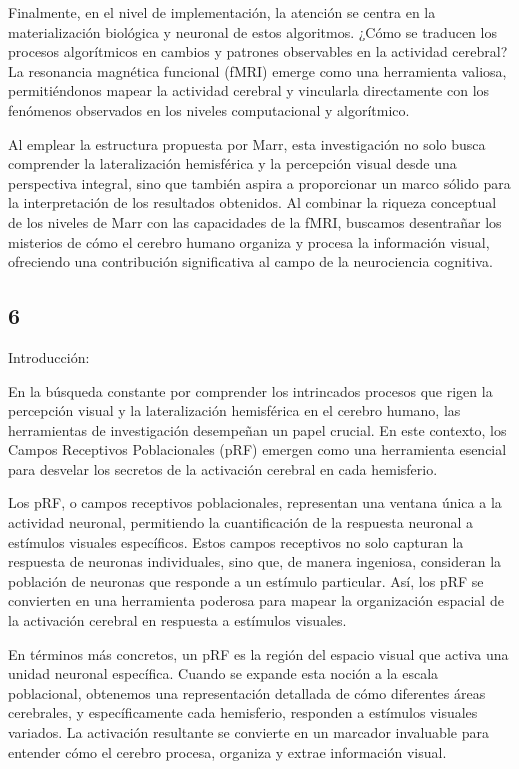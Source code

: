 \documentclass{article}
\begin{document}
	Finalmente, en el nivel de implementación, la atención se centra en la materialización biológica y neuronal de estos algoritmos. ¿Cómo se traducen los procesos algorítmicos en cambios y patrones observables en la actividad cerebral? La resonancia magnética funcional (fMRI) emerge como una herramienta valiosa, permitiéndonos mapear la actividad cerebral y vincularla directamente con los fenómenos observados en los niveles computacional y algorítmico.
	
	Al emplear la estructura propuesta por Marr, esta investigación no solo busca comprender la lateralización hemisférica y la percepción visual desde una perspectiva integral, sino que también aspira a proporcionar un marco sólido para la interpretación de los resultados obtenidos. Al combinar la riqueza conceptual de los niveles de Marr con las capacidades de la fMRI, buscamos desentrañar los misterios de cómo el cerebro humano organiza y procesa la información visual, ofreciendo una contribución significativa al campo de la neurociencia cognitiva.
	
	\subsection{6}
	
	Introducción:
	
	En la búsqueda constante por comprender los intrincados procesos que rigen la percepción visual y la lateralización hemisférica en el cerebro humano, las herramientas de investigación desempeñan un papel crucial. En este contexto, los Campos Receptivos Poblacionales (pRF) emergen como una herramienta esencial para desvelar los secretos de la activación cerebral en cada hemisferio.
	
	Los pRF, o campos receptivos poblacionales, representan una ventana única a la actividad neuronal, permitiendo la cuantificación de la respuesta neuronal a estímulos visuales específicos. Estos campos receptivos no solo capturan la respuesta de neuronas individuales, sino que, de manera ingeniosa, consideran la población de neuronas que responde a un estímulo particular. Así, los pRF se convierten en una herramienta poderosa para mapear la organización espacial de la activación cerebral en respuesta a estímulos visuales.
	
	En términos más concretos, un pRF es la región del espacio visual que activa una unidad neuronal específica. Cuando se expande esta noción a la escala poblacional, obtenemos una representación detallada de cómo diferentes áreas cerebrales, y específicamente cada hemisferio, responden a estímulos visuales variados. La activación resultante se convierte en un marcador invaluable para entender cómo el cerebro procesa, organiza y extrae información visual.
	
\end{document}
